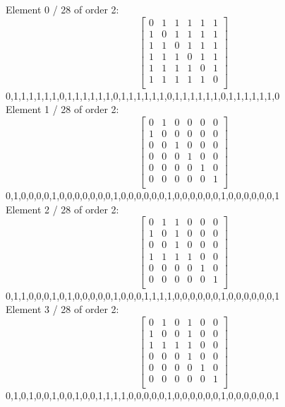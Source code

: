 Element     0 / 28 of order 2:
$$
\left[
\begin{array}{*{6}{r}}
0 & 1 & 1 & 1 & 1 & 1\\
1 & 0 & 1 & 1 & 1 & 1\\
1 & 1 & 0 & 1 & 1 & 1\\
1 & 1 & 1 & 0 & 1 & 1\\
1 & 1 & 1 & 1 & 0 & 1\\
1 & 1 & 1 & 1 & 1 & 0\\
\end{array}
\right]
$$
0,1,1,1,1,1,1,0,1,1,1,1,1,1,0,1,1,1,1,1,1,0,1,1,1,1,1,1,0,1,1,1,1,1,1,0\\
Element     1 / 28 of order 2:
$$
\left[
\begin{array}{*{6}{r}}
0 & 1 & 0 & 0 & 0 & 0\\
1 & 0 & 0 & 0 & 0 & 0\\
0 & 0 & 1 & 0 & 0 & 0\\
0 & 0 & 0 & 1 & 0 & 0\\
0 & 0 & 0 & 0 & 1 & 0\\
0 & 0 & 0 & 0 & 0 & 1\\
\end{array}
\right]
$$
0,1,0,0,0,0,1,0,0,0,0,0,0,0,1,0,0,0,0,0,0,1,0,0,0,0,0,0,1,0,0,0,0,0,0,1\\
Element     2 / 28 of order 2:
$$
\left[
\begin{array}{*{6}{r}}
0 & 1 & 1 & 0 & 0 & 0\\
1 & 0 & 1 & 0 & 0 & 0\\
0 & 0 & 1 & 0 & 0 & 0\\
1 & 1 & 1 & 1 & 0 & 0\\
0 & 0 & 0 & 0 & 1 & 0\\
0 & 0 & 0 & 0 & 0 & 1\\
\end{array}
\right]
$$
0,1,1,0,0,0,1,0,1,0,0,0,0,0,1,0,0,0,1,1,1,1,0,0,0,0,0,0,1,0,0,0,0,0,0,1\\
Element     3 / 28 of order 2:
$$
\left[
\begin{array}{*{6}{r}}
0 & 1 & 0 & 1 & 0 & 0\\
1 & 0 & 0 & 1 & 0 & 0\\
1 & 1 & 1 & 1 & 0 & 0\\
0 & 0 & 0 & 1 & 0 & 0\\
0 & 0 & 0 & 0 & 1 & 0\\
0 & 0 & 0 & 0 & 0 & 1\\
\end{array}
\right]
$$
0,1,0,1,0,0,1,0,0,1,0,0,1,1,1,1,0,0,0,0,0,1,0,0,0,0,0,0,1,0,0,0,0,0,0,1\\
